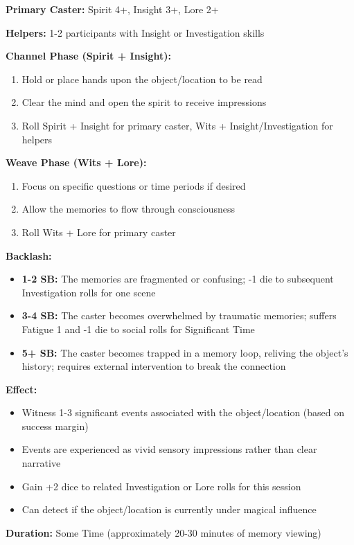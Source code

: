 \textbf{Primary Caster:} Spirit 4+, Insight 3+, Lore 2+

\textbf{Helpers:} 1-2 participants with Insight or Investigation skills

\textbf{Channel Phase (Spirit + Insight):}
\begin{enumerate}
\item Hold or place hands upon the object/location to be read
\item Clear the mind and open the spirit to receive impressions
\item Roll Spirit + Insight for primary caster, Wits + Insight/Investigation for helpers
\end{enumerate}

\textbf{Weave Phase (Wits + Lore):}
\begin{enumerate}
\item Focus on specific questions or time periods if desired
\item Allow the memories to flow through consciousness
\item Roll Wits + Lore for primary caster
\end{enumerate}

\textbf{Backlash:}
\begin{itemize}
\item \textbf{1-2 SB:} The memories are fragmented or confusing; -1 die to subsequent Investigation rolls for one scene
\item \textbf{3-4 SB:} The caster becomes overwhelmed by traumatic memories; suffers Fatigue 1 and -1 die to social rolls for Significant Time
\item \textbf{5+ SB:} The caster becomes trapped in a memory loop, reliving the object's history; requires external intervention to break the connection
\end{itemize}

\textbf{Effect:}
\begin{itemize}
\item Witness 1-3 significant events associated with the object/location (based on success margin)
\item Events are experienced as vivid sensory impressions rather than clear narrative
\item Gain +2 dice to related Investigation or Lore rolls for this session
\item Can detect if the object/location is currently under magical influence
\end{itemize}

\textbf{Duration:} Some Time (approximately 20-30 minutes of memory viewing)

